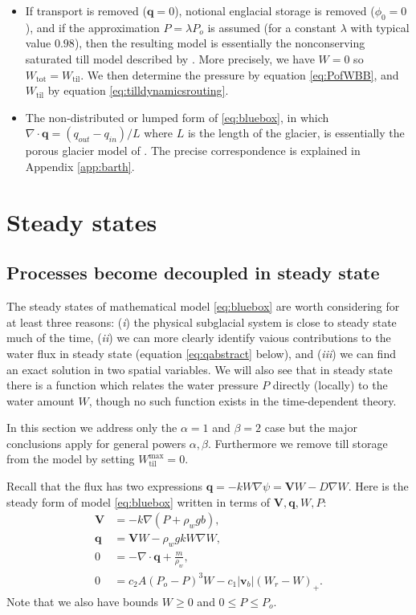 \documentclass[11pt,final]{amsart}
\newcommand\bv{\mathbf{v}}
\newcommand\bV{\mathbf{V}}
\newcommand\bq{\mathbf{q}}
\newcommand{\Div}{\nabla\cdot}
\newcommand{\grad}{\nabla}
\newcommand{\Wtil}{W_{\text{til}}}
\newcommand{\Wtilmax}{W_{\text{til}}^{\text{max}}}
\newcommand{\Wtot}{W_{\text{tot}}}
\begin{document}
\begin{itemize}
\item If transport is removed ($\bq=0$), notional englacial storage is removed ($\phi_0=0$), and if the approximation $P=\lambda P_o$ is assumed (for a constant $\lambda$ with typical value $0.98$), then the resulting model is essentially the nonconserving saturated till model described by \cite{BBssasliding}.  More precisely, we have $W=0$ so $\Wtot=\Wtil$.  We then determine the pressure by equation \eqref{eq:PofWBB}, and $\Wtil$ by equation \eqref{eq:tilldynamicsrouting}.

\item The non-distributed or lumped form of \eqref{eq:bluebox}, in which $\Div \bq = (q_{out} - q_{in})/L$ where $L$ is the length of the glacier, is essentially the porous glacier model of \cite{Bartholomausetal2011}.  The precise correspondence is explained in Appendix \ref{app:barth}.
\end{itemize}


\section{Steady states}  \label{sec:steadyverif}

\subsection*{Processes become decoupled in steady state}  The steady states of mathematical model \eqref{eq:bluebox} are worth considering for at least three reasons: (\emph{i}) the physical subglacial system is close to steady state much of the time, (\emph{ii}) we can more clearly identify vaious contributions to the water flux in steady state (equation \eqref{eq:qabstract} below), and (\emph{iii}) we can find an exact solution in two spatial variables.  We will also see that in steady state there is a function which relates the water pressure $P$ directly (locally) to the water amount $W$, though no such function exists in the time-dependent theory.

In this section we address only the $\alpha=1$ and $\beta=2$ case but the major conclusions apply for general powers $\alpha,\beta$.  Furthermore we remove till storage from the model by setting $\Wtilmax=0$.

Recall that the flux has two expressions $\bq = - k W \grad \psi = \bV W - D \grad W$.  Here is the steady form of model \eqref{eq:bluebox} written in terms of $\bV,\bq,W,P$:
\begin{align}
\bV &= - k \grad \left(P + \rho_w g b\right), \label{eq:Vsteady} \\
\bq &= \bV W - \rho_w g k W \grad W, \label{eq:qsteady} \\
0 &= - \Div \bq + \frac{m}{\rho_w}, \label{eq:masscontsteady} \\
0 &= c_2 A (P_o - P)^3 W - c_1 |\bv_b| (W_r - W)_+. \label{eq:openclosesteady}
\end{align}
Note that we also have bounds $W\ge 0$ and $0 \le P \le P_o$.
\end{document}
